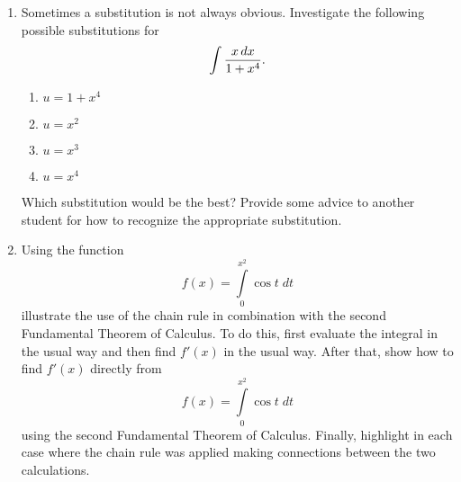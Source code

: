 \section{}
\begin{enumerate}%


\item   Sometimes a substitution is not always obvious.  Investigate the following possible substitutions for $$\int {{{x\,dx} \over {1 + x^4 }}} .$$	
\begin{enumerate} \item $u = 1 + x^4$\item $u = x^2$\item $u = x^3$\item $u = x^4$\end{enumerate}
Which substitution would be the best?  Provide some advice to another student for how to recognize the appropriate substitution. 

\item   Using the function $$f(x) = \int\limits_0^{x^2 } {\cos t\;dt} $$ illustrate the use of the chain rule in combination with the second Fundamental Theorem of Calculus.  To do this, first evaluate the integral in the usual way and then find $f'(x)$ in the usual way.  After that, show how to find $f'(x)$ directly from $$f(x) = \int\limits_0^{x^2 } {\cos t\;dt} $$ using the second Fundamental Theorem of Calculus.  Finally, highlight in each case where the chain rule was applied making connections between the two calculations.



\end{enumerate}





